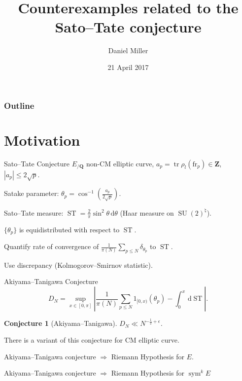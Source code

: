 \documentclass[handout]{beamer}
\title{Counterexamples related to the Sato--Tate conjecture}
\author{Daniel Miller}
\institute{Cornell University}
\date{21 April 2017}
\DeclareMathOperator{\ST}{ST}
\DeclareMathOperator{\SU}{SU}
\DeclareMathOperator{\sym}{sym}
\DeclareMathOperator{\tr}{tr}
\newcommand{\bQ}{\mathbf{Q}}
\newcommand{\bZ}{\mathbf{Z}}
\newcommand{\dd}{\mathrm{d}}
\newcommand{\frob}{\mathrm{fr}}
\newtheorem{conjecture}{Conjecture}
\begin{document}
\begin{frame}
\titlepage
\end{frame}

\begin{frame}
\frametitle{Outline}
\tableofcontents
\end{frame}





\section{Motivation}

\begin{frame}{Sato--Tate Conjecture}
$E_{/\bQ}$ non-CM elliptic curve, $a_p = \tr\rho_l(\frob_p)\in \bZ$, 
$|a_p|\leqslant 2\sqrt p$. 
\pause

Satake parameter: $\theta_p = \cos^{-1}\left( \frac{a_p}{2\sqrt p}\right)$. 
\pause

Sato--Tate measure: $\ST = \frac{2}{\pi} \sin^2 \theta\, \dd \theta$ (Haar 
measure on $\SU(2)^\natural$). 
\pause

\begin{theorem}[Taylor et.~al.]
$\{\theta_p\}$ is equidistributed with respect to $\ST$. 
\end{theorem}
\pause

Quantify rate of convergence of 
$\frac{1}{\pi(N)} \sum_{p\leqslant N} \delta_{\theta_p}$ to $\ST$. 
\pause

Use discrepancy (Kolmogorov--Smirnov statistic). 
\end{frame}


\begin{frame}{Akiyama--Tanigawa Conjecture}
\[
	D_N = \sup_{x\in [0,\pi]}\left| \frac{1}{\pi(N)} \sum_{p\leqslant N} 1_{[0,x)}(\theta_p) - \int_0^x \, \dd\ST\right| .
\]
\pause

\begin{conjecture}[Akiyama--Tanigawa]
$D_N \ll N^{-\frac 1 2 + \epsilon}$. 
\end{conjecture}
\pause

There is a variant of this conjecture for CM elliptic curve.
\pause

\begin{theorem}
Akiyama--Tanigawa conjecture $\Rightarrow$ Riemann Hypothesis for $E$.
\end{theorem}
\pause

\begin{theorem}[Mazur]
Akiyama--Tanigawa conjecture $\Rightarrow$ Riemann Hypothesis for $\sym^k E$
\end{theorem}
\end{frame}
\end{document}
